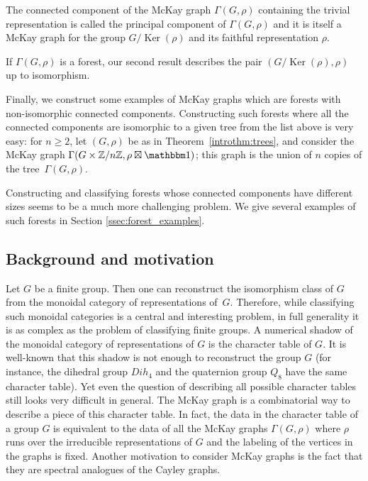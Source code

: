\documentclass[ALCO]{cedram}
\newcommand{\triv}{{\mathbbm 1}}
\newcommand{\Ker}{\operatorname{Ker}}
\newcommand{\Z}{{\mathbb Z}}
\begin{document}
\begin{rema}\label{intrormk:principal_comp}
The connected component of the McKay graph $\Gamma(G,\rho)$ containing the trivial representation is called the principal component of $\Gamma(G,\rho)$ and it is itself a McKay graph for the group $G/\Ker(\rho)$ and its faithful representation $\rho$. 

If $\Gamma(G,\rho)$ is a forest, our second result describes the pair $(G/\Ker(\rho), \rho)$ up to isomorphism.
\end{rema}

{
Finally, we construct some examples of McKay graphs which are forests with non-isomorphic connected components. Constructing such forests where all the connected components are isomorphic to a given tree from the list above is very easy: for $n\geq 2$, let $(G, \rho)$ be as in Theorem~\ref{introthm:trees}, and consider the McKay graph $\Gamma(G\times \Z/n\Z, \rho \boxtimes \triv)$; this graph is the union of $n$ copies of the tree~$\Gamma(G, \rho)$. 

Constructing and classifying forests whose connected components have different sizes seems to be a much more challenging problem. We give several examples of such forests in Section \ref{ssec:forest_examples}.

}


\subsection{Background and motivation}
Let $G$ be a finite group. Then one can reconstruct the isomorphism class of $G$ from the monoidal category of representations of~$G$. Therefore, while classifying such monoidal categories is a central and interesting problem, in full generality it is as {complex} as the problem of classifying finite groups. A numerical shadow of the monoidal category of representations of $G$ is the character table of $G$. 
It is well-known that this shadow is not enough to reconstruct the group $G$ (for instance, the dihedral group $Dih_4$ and the quaternion group $Q_8$ have the same character table). Yet even the question of describing all {possible} character tables still looks very difficult in general. The McKay graph is a combinatorial way to describe a piece of this character table. In fact, the data in the character table of a group $G$ is equivalent to the data of all the McKay graphs $\Gamma(G, \rho)$ where $\rho$ runs over the irreducible representations of $G$ and the labeling of the vertices in the graphs is fixed.
Another motivation to consider McKay graphs is the fact that they are spectral analogues of the Cayley graphs.
\end{document}

